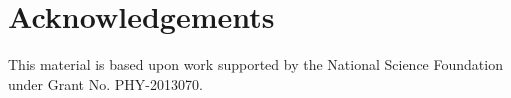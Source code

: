 \documentclass[12pt, a4paper]{article}
\begin{document}




\clearpage

\section*{Acknowledgements}

This material is based upon work supported by the National Science Foundation under Grant No. PHY-2013070.







\end{document}
